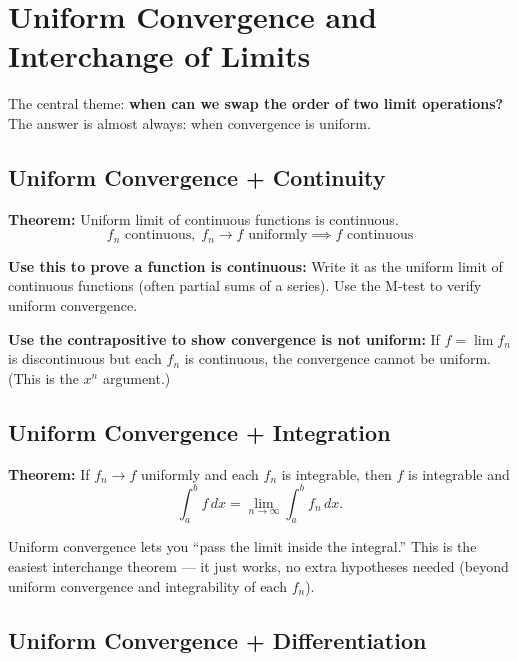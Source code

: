 \documentclass[11pt]{article}
\theoremstyle{definition}
\begin{document}
\section{Uniform Convergence and Interchange of Limits}

The central theme: \textbf{when can we swap the order of two limit operations?} The answer is almost always: when convergence is uniform.

\subsection{Uniform Convergence + Continuity}

\textbf{Theorem:} Uniform limit of continuous functions is continuous.
$$f_n \text{ continuous}, \; f_n \to f \text{ uniformly} \implies f \text{ continuous}$$

\begin{application}
\textbf{Use this to prove a function is continuous:} Write it as the uniform limit of continuous functions (often partial sums of a series). Use the M-test to verify uniform convergence.

\textbf{Use the contrapositive to show convergence is not uniform:} If $f = \lim f_n$ is discontinuous but each $f_n$ is continuous, the convergence cannot be uniform. (This is the $x^n$ argument.)
\end{application}

\subsection{Uniform Convergence + Integration}

\textbf{Theorem:} If $f_n \to f$ uniformly and each $f_n$ is integrable, then $f$ is integrable and
$$\int_a^b f \, dx = \lim_{n \to \infty} \int_a^b f_n \, dx.$$

\begin{intuition}
Uniform convergence lets you ``pass the limit inside the integral.'' This is the easiest interchange theorem --- it just works, no extra hypotheses needed (beyond uniform convergence and integrability of each $f_n$).
\end{intuition}

\subsection{Uniform Convergence + Differentiation}
\end{document}
